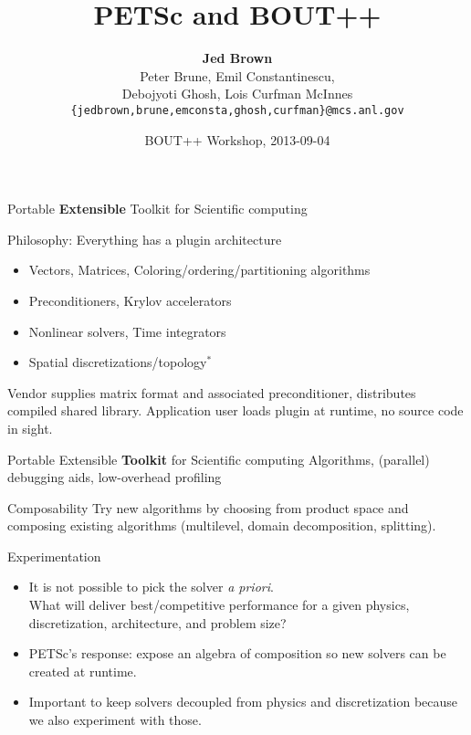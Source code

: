 \documentclass{beamer}
\title{PETSc and BOUT++}
\author{{\bf Jed Brown} \\
Peter Brune, Emil Constantinescu, \\
Debojyoti Ghosh, Lois Curfman McInnes \\
\texttt{\{jedbrown,brune,emconsta,ghosh,curfman\}@mcs.anl.gov}
}
\institute
{
  Mathematics and Computer Science Division \\ Argonne National Laboratory
}
\date{BOUT++ Workshop, 2013-09-04}
\begin{document}
\lstset{language=C}
\normalem

\begin{frame}
  \titlepage
\end{frame}

\begin{frame}{Portable {\bf Extensible} Toolkit for Scientific computing}
\begin{block}{Philosophy: Everything has a plugin architecture}
\begin{itemize}
  \item Vectors, Matrices, Coloring/ordering/partitioning algorithms
  \item Preconditioners, Krylov accelerators
  \item Nonlinear solvers, Time integrators
  \item Spatial discretizations/topology$^*$
\end{itemize}
\end{block}
\begin{example}
	Vendor supplies matrix format and associated preconditioner, distributes
	compiled shared library.  Application user loads plugin at runtime, no source
	code in sight.
\end{example}
\end{frame}

\begin{frame}{Portable Extensible {\bf Toolkit} for Scientific computing}
Algorithms, (parallel) debugging aids, low-overhead profiling
\begin{block}{Composability}
Try new algorithms by choosing from product space and composing
existing algorithms (multilevel, domain decomposition, splitting).
\end{block}
\begin{block}{Experimentation}
\begin{itemize}
  \item It is not possible to pick the solver \emph{a priori}. \\
  What will deliver best/competitive performance for a given physics, discretization, architecture, and problem size?
  \item PETSc's response: expose an algebra of composition so new solvers can be created at runtime.
  \item Important to keep solvers decoupled from physics and discretization because we also experiment with those. 
\end{itemize}
\end{block}
\end{frame}
\end{document}
